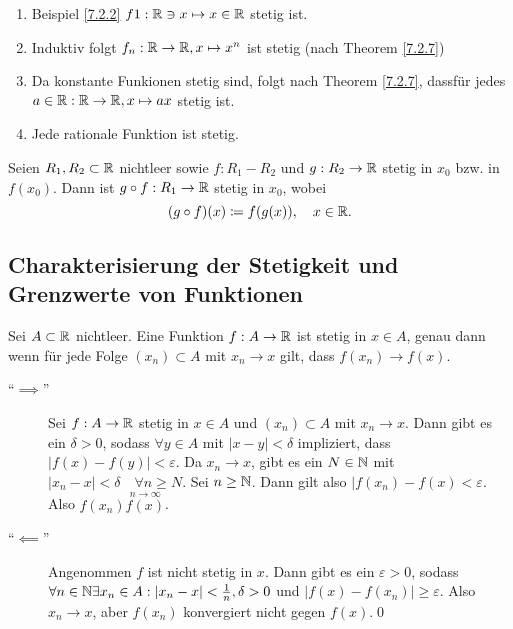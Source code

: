 \begin{subexample}
	\begin{enumerate}[label=\arabic*.]
		\item Beispiel \ref{7.2.2} $ f1 : \mathbb{R} \ni x \mapsto x \in \mathbb{R}  $ stetig ist.
		\item Induktiv folgt $ f_n : \mathbb{R} \to \mathbb{R} , x \mapsto x^n $ ist stetig
			(nach Theorem \ref{7.2.7})
		\item Da konstante Funkionen stetig sind, folgt nach Theorem \ref{7.2.7}, dassfür jedes $ a \in \mathbb{R} : \mathbb{R} \to \mathbb{R} , x \mapsto ax $ stetig ist.
		\item Jede rationale Funktion ist stetig.
	\end{enumerate}
	
\end{subexample}

\begin{subtheorem}[(Präsenzaufgabe)]
	Seien $ R_1, R_2 \subset \mathbb{R}  $ nichtleer sowie $ f: R_1 - R_2 $ und $ g:R_2\to \mathbb{R}  $ stetig in $ x_0 $ bzw. in $ f(x_0) $. Dann ist $ g \circ f : R_1 \to \mathbb{R}  $ stetig in $ x_0 $, wobei
	\[
		(g \circ f) (x) \coloneqq f(g(x)), \quad x \in \mathbb{R} .
	\]
	
\end{subtheorem}

\subsection{Charakterisierung der Stetigkeit und Grenzwerte von Funktionen}
\begin{subtheorem}
	Sei $  A \subset \mathbb{R}  $ nichtleer.
	Eine Funktion $ f: A \to  \mathbb{R}   $ ist stetig in $ x \in  A $, genau dann wenn für jede Folge $ (x_n) \subset A $ mit $ x_n \to x $ gilt, dass $ f(x_n) \to f(x) $.
\end{subtheorem}

\begin{subproof}[Theorem 7.3.1]
	\begin{description}
		\item[``$ \implies  $''] Sei $ f: A\to \mathbb{R}  $ stetig in $ x \in A $ und $ (x_n) \subset A $ mit $ x_n \to x $.
			Dann gibt es ein $ \delta > 0 $, sodass $ \forall y \in A $ mit $ |x - y| < \delta $ impliziert, dass $ |f(x) - f(y)| < \varepsilon  $.
			Da $ x_n \to x $, gibt es ein $ N \in \mathbb{N}  $ mit $ |x_n - x| < \delta \quad \forall n\geq N $.
			Sei $ n\geq \mathbb{N}  $. Dann gilt also $ |f(x_n) - f(x) < \varepsilon  $.
			Also $ f(x_n) \overset{n\to \infty}{f(x)} $.
		\item[``$ \impliedby  $''] Angenommen $ f $ ist nicht stetig in $ x $.
			Dann gibt es ein $ \varepsilon > 0 $, sodass $ \forall n \in \mathbb{N}  \exists x_n \in A : |x_n - x| < \frac{ 1 }{ n }, \delta > 0 $ und $ |f(x) - f(x_n)| \geq \varepsilon  $.
			Also $  x_n \to x $, aber $ f(x_n) $ konvergiert nicht gegen $ f(x) $.\qed
	\end{description}
\end{subproof}

